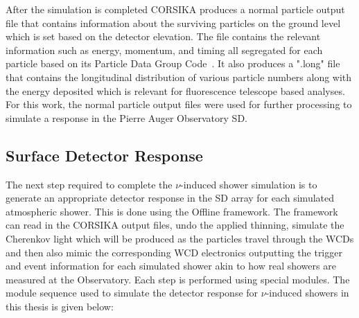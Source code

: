 After the simulation is completed CORSIKA produces a normal particle output file that contains information about the surviving particles on the ground level which is set based on the detector elevation. The file contains the relevant information such as energy, momentum, and timing all segregated for each particle based on its Particle Data Group Code~\cite{}. It also produces a ".long" file that contains the longitudinal distribution of various particle numbers along with the energy deposited which is relevant for fluorescence telescope based analyses. For this work, the normal particle output files were used for further processing to simulate a response in the Pierre Auger Observatory SD.

\subsection{Surface Detector Response}
\label{subsec:sim_SD_resp}

The next step required to complete the $\nu$-induced shower simulation is to generate an appropriate detector response in the SD array for each simulated atmospheric shower. This is done using the Offline framework. The framework can read in the CORSIKA output files, undo the applied thinning, simulate the Cherenkov light which will be produced as the particles travel through the WCDs and then also mimic the corresponding WCD electronics outputting the trigger and event information for each simulated shower akin to how real showers are measured at the Observatory. Each step is performed using special modules. The module sequence used to simulate the detector response for $\nu$-induced showers in this thesis is given below: 



